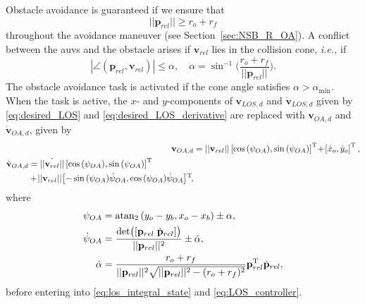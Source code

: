 Obstacle avoidance is guaranteed if we ensure that
\begin{equation}
    ||\mathbf{p}_{rel}|| \geq r_o + r_f
    \label{eq:obstacle_avoidance_condition}
\end{equation}
throughout the avoidance maneuver (see Section~\ref{sec:NSB_R_OA}).
A conflict between the \glspl{auv} and the obstacle arises if $\mathbf{v}_{rel}$ lies in the collision cone, \emph{i.e.,} if
\begin{equation}
    |\angle (\mathbf{p}_{rel}, \mathbf{v}_{rel})| \leq \alpha ,\quad \alpha = \sin^{-1}\bigl(\frac{r_o+r_f}{||\mathbf{p}_{rel}||}\bigr).
    \label{eq:collision-conflict}
\end{equation}
The obstacle avoidance task is activated if the cone angle satisfies $\alpha > \alpha_{\min}$. 
When the task is active, the $x$- and $y$-components of  $\mathbf{v}_{LOS,d}$ and $\dot{\mathbf{v}}_{LOS,d}$  given by \eqref{eq:desired_LOS} and \eqref{eq:desired_LOS_derivative} are replaced with $\mathbf{v}_{OA,d}$ and $\dot{\mathbf{v}}_{OA,d}$, given by
\begin{align}
    \mathbf{v}_{OA,d} &= ||\mathbf{v}_{rel}|| \left[\cos{(\psi_{OA})}, \sin{(\psi_{OA})}\right]^{\mathrm{T}} \!+\! \left[\dot{x}_o, \dot{y}_o \right]^{\mathrm{T}},\label{eq:v_OA}\\
    \begin{split}\label{eq:v_OA_dot}
    \dot{\mathbf{v}}_{OA,d} &= \dot{||\mathbf{v}_{rel}||}\left[ \cos{(\psi_{OA})}, \sin{(\psi_{OA})}\right]^{\mathrm{T}} \\&+ \!||\mathbf{v}_{rel}||\!\left[ -\sin{(\psi_{OA})}\dot{\psi}_{OA}, \cos{(\psi_{OA})} \dot{\psi}_{OA}\right]\!^{\mathrm{T}}\!,
    \end{split}
\end{align}
where
\begin{align}
    \psi_{OA} &= \mathrm{atan}_2 \left(y_o-y_b, x_o-x_b\right) \pm \alpha,\\
    \dot{\psi}_{OA} &= \frac{\mathrm{det}\bigl([\mathbf{p}_{rel}\; \dot{\mathbf{p}}_{rel}]\bigr)}{||\mathbf{p}_{rel}||^2} \pm \dot{\alpha},\\
    \dot{\alpha} &= \frac{r_o+r_f}{||\mathbf{p}_{rel}||^2\sqrt{||\mathbf{p}_{rel}||^2-(r_o+r_f)^2}}\mathbf{p}_{rel}^{\mathrm{T}} \dot{\mathbf{p}}_{rel},
\end{align}
 before entering into \eqref{eq:los_integral_state} and \eqref{eq:LOS_controller}.
 

